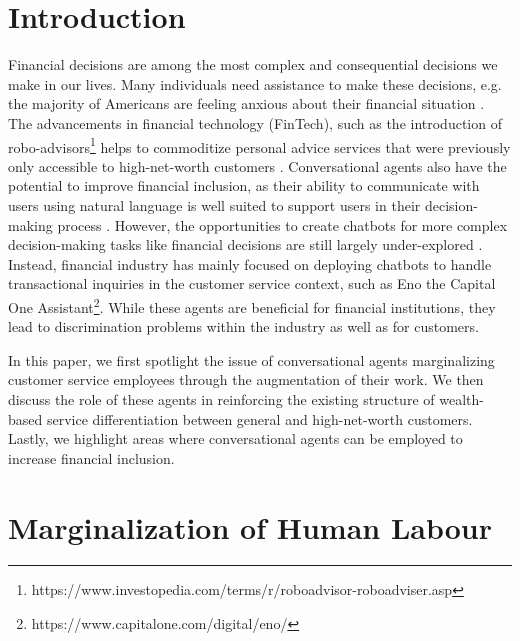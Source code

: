 \documentclass{sigchi-ext}
\begin{document}
\printccsdesc


\section{Introduction}

Financial decisions are among the most complex and consequential decisions we make in our lives. Many individuals need assistance to make these decisions, e.g. the majority of Americans are feeling anxious about their financial situation \cite{capitalone2020}. The advancements in financial technology (FinTech), such as the introduction of robo-advisors\footnote{https://www.investopedia.com/terms/r/roboadvisor-roboadviser.asp} helps to commoditize personal advice services that were previously only accessible to high-net-worth customers \cite{philippon2019fintech}. Conversational agents also have the potential to improve financial inclusion, as their ability to communicate with users using natural language is well suited to support users in their decision-making process \cite{volkel2021eliciting}. However, the opportunities to create chatbots for more complex decision-making tasks like financial decisions are still largely under-explored \cite{reicherts2022extending}. Instead, financial industry has mainly focused on deploying chatbots to handle transactional inquiries in the customer service context, such as Eno the Capital One Assistant\footnote{https://www.capitalone.com/digital/eno/}. While these agents are beneficial for financial institutions, they lead to discrimination problems within the industry as well as for customers.

In this paper, we first spotlight the issue of conversational agents marginalizing customer service employees through the augmentation of their work. We then discuss the role of these agents in reinforcing the existing structure of wealth-based service differentiation
between general and high-net-worth customers. Lastly, we highlight areas where conversational agents can be employed to increase financial inclusion.


\section{Marginalization of Human Labour}
\end{document}
